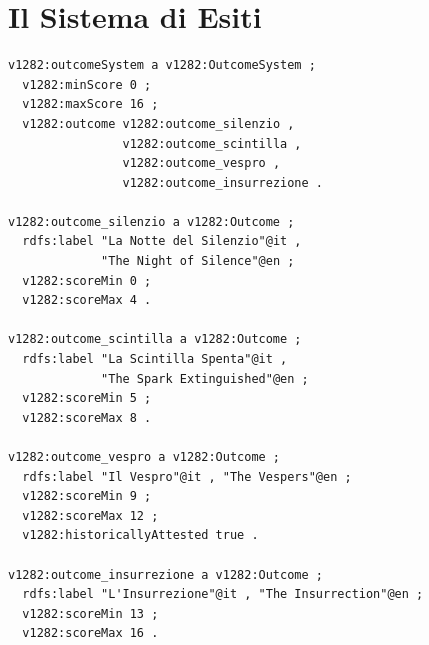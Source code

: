 \section{Il Sistema di Esiti}

\begin{verbatim}
v1282:outcomeSystem a v1282:OutcomeSystem ;
  v1282:minScore 0 ;
  v1282:maxScore 16 ;
  v1282:outcome v1282:outcome_silenzio ,
                v1282:outcome_scintilla ,
                v1282:outcome_vespro ,
                v1282:outcome_insurrezione .

v1282:outcome_silenzio a v1282:Outcome ;
  rdfs:label "La Notte del Silenzio"@it ,
             "The Night of Silence"@en ;
  v1282:scoreMin 0 ;
  v1282:scoreMax 4 .

v1282:outcome_scintilla a v1282:Outcome ;
  rdfs:label "La Scintilla Spenta"@it ,
             "The Spark Extinguished"@en ;
  v1282:scoreMin 5 ;
  v1282:scoreMax 8 .

v1282:outcome_vespro a v1282:Outcome ;
  rdfs:label "Il Vespro"@it , "The Vespers"@en ;
  v1282:scoreMin 9 ;
  v1282:scoreMax 12 ;
  v1282:historicallyAttested true .

v1282:outcome_insurrezione a v1282:Outcome ;
  rdfs:label "L'Insurrezione"@it , "The Insurrection"@en ;
  v1282:scoreMin 13 ;
  v1282:scoreMax 16 .
\end{verbatim}

\filettodoppio
